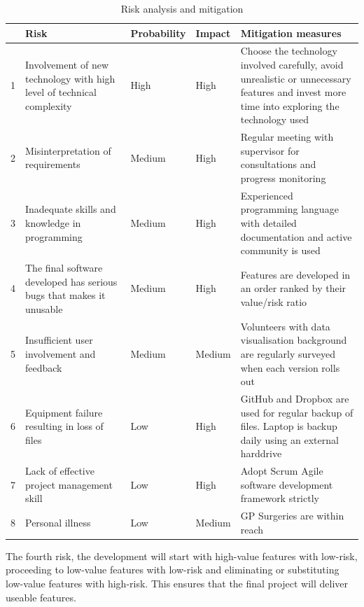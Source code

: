 \documentclass[doc,natbib]{apa6}
\begin{document}
\begin{table}[H]
	\centering
			\caption{Risk analysis and mitigation}
	\label{tab:4}
	\begin{tabularx}{\textwidth}{p{0.2cm} X|>{\raggedleft\arraybackslash}p{2cm}|>{\raggedleft\arraybackslash}p{1.2cm}|X}
		\hline\hline
		& \textbf{Risk} & \textbf{Probability} & \textbf{Impact} & \textbf{Mitigation measures} \\\hline
		1&	Involvement of new technology with high level of technical complexity & High & High & Choose the technology involved carefully, avoid unrealistic or unnecessary features and invest more time into exploring the technology	used	 \\\hline
		2&Misinterpretation of requirements                      & Medium            & High            &  Regular meeting with supervisor for consultations and progress monitoring     \\\hline
		3&Inadequate skills and knowledge in programming        & Medium             & High         &    Experienced programming language with detailed documentation and active community is used   \\\hline
		4&The final software developed has serious bugs that makes it unusable & Medium & High  & Features are developed in an order ranked by their value/risk ratio \\\hline
		5&Insufficient user involvement and feedback                   & Medium        &    Medium        &   Volunteers with data visualisation background are regularly surveyed when each version rolls out     \\\hline
		6&Equipment failure resulting in loss of files & Low & High & GitHub and Dropbox are used for regular backup of files. Laptop is backup daily using an external harddrive 	\\\hline
		7&Lack of effective project management skill & Low & High & Adopt Scrum Agile software development framework strictly 	\\\hline
		8&Personal illness  & Low & Medium & GP Surgeries are within reach\\\hline
		\hline
	\end{tabularx}
\end{table}

The fourth risk,  the development will start with high-value features with low-risk, proceeding to low-value features with low-risk and eliminating or substituting low-value features with high-risk. This ensures that the final project will deliver useable features.
\end{document}
